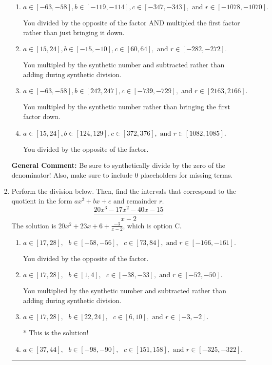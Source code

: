 \documentclass{extbook}[14pt]
\newcommand{\litem}[1]{\item #1

\rule{\textwidth}{0.4pt}}
\begin{document}
\begin{enumerate}
{\begin{enumerate}[label=\Alph*.]
* This is the solution!
\item \( a \in [-63, -58], b \in [-119, -114], c \in [-347, -343], \text{ and } r \in [-1078, -1070]. \)

 You divided by the opposite of the factor AND multipled the first factor rather than just bringing it down.
\item \( a \in [15, 24], b \in [-15, -10], c \in [60, 64], \text{ and } r \in [-282, -272]. \)

 You multipled by the synthetic number and subtracted rather than adding during synthetic division.
\item \( a \in [-63, -58], b \in [242, 247], c \in [-739, -729], \text{ and } r \in [2163, 2166]. \)

 You multipled by the synthetic number rather than bringing the first factor down.
\item \( a \in [15, 24], b \in [124, 129], c \in [372, 376], \text{ and } r \in [1082, 1085]. \)

 You divided by the opposite of the factor.
\end{enumerate}

\textbf{General Comment:} Be sure to synthetically divide by the zero of the denominator! Also, make sure to include 0 placeholders for missing terms.
}
\litem{
Perform the division below. Then, find the intervals that correspond to the quotient in the form $ax^2+bx+c$ and remainder $r$.
\[ \frac{20x^{3} -17 x^{2} -40 x -15}{x -2} \]The solution is \( 20x^{2} +23 x + 6 + \frac{-3}{x -2} \), which is option C.\begin{enumerate}[label=\Alph*.]
\item \( a \in [17, 28], \text{   } b \in [-58, -56], \text{   } c \in [73, 84], \text{   and   } r \in [-166, -161]. \)

 You divided by the opposite of the factor.
\item \( a \in [17, 28], \text{   } b \in [1, 4], \text{   } c \in [-38, -33], \text{   and   } r \in [-52, -50]. \)

 You multiplied by the synthetic number and subtracted rather than adding during synthetic division.
\item \( a \in [17, 28], \text{   } b \in [22, 24], \text{   } c \in [6, 10], \text{   and   } r \in [-3, -2]. \)

* This is the solution!
\item \( a \in [37, 44], \text{   } b \in [-98, -90], \text{   } c \in [151, 158], \text{   and   } r \in [-325, -322]. \)


\end{enumerate}}
\end{enumerate}
\end{document}

